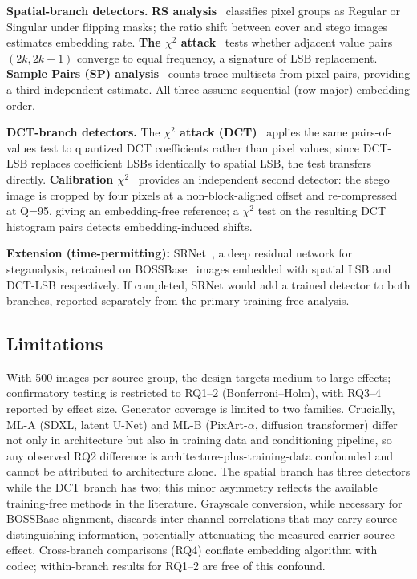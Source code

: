 \documentclass[10pt,twocolumn,a4paper]{article}
\begin{document}
\textbf{Spatial-branch detectors.} \textbf{RS analysis}~\cite{fridrich2001lsb} classifies pixel groups as Regular or Singular under flipping masks; the ratio shift between cover and stego images estimates embedding rate. \textbf{The $\chi^2$ attack}~\cite{westfeld1999chi} tests whether adjacent value pairs $(2k, 2k\!+\!1)$ converge to equal frequency, a signature of LSB replacement. \textbf{Sample Pairs (SP) analysis}~\cite{dumitrescu2003sp} counts trace multisets from pixel pairs, providing a third independent estimate. All three assume sequential (row-major) embedding order.

\textbf{DCT-branch detectors.} The \textbf{$\chi^2$ attack (DCT)}~\cite{westfeld1999chi} applies the same pairs-of-values test to quantized DCT coefficients rather than pixel values; since DCT-LSB replaces coefficient LSBs identically to spatial LSB, the test transfers directly. \textbf{Calibration $\chi^2$}~\cite{fridrich2003calib} provides an independent second detector: the stego image is cropped by four pixels at a non-block-aligned offset and re-compressed at Q=95, giving an embedding-free reference; a $\chi^2$ test on the resulting DCT histogram pairs detects embedding-induced shifts.

\textbf{Extension (time-permitting):} SRNet~\cite{boroumand2019srnet}, a deep residual network for steganalysis, retrained on BOSSBase~\cite{bas2011boss} images embedded with spatial LSB and DCT-LSB respectively. If completed, SRNet would add a trained detector to both branches, reported separately from the primary training-free analysis.

\subsection{Limitations}

With 500 images per source group, the design targets medium-to-large effects; confirmatory testing is restricted to RQ1--2 (Bonferroni--Holm), with RQ3--4 reported by effect size. Generator coverage is limited to two families. Crucially, ML-A (SDXL, latent U-Net) and ML-B (PixArt-$\alpha$, diffusion transformer) differ not only in architecture but also in training data and conditioning pipeline, so any observed RQ2 difference is architecture-plus-training-data confounded and cannot be attributed to architecture alone. The spatial branch has three detectors while the DCT branch has two; this minor asymmetry reflects the available training-free methods in the literature. Grayscale conversion, while necessary for BOSSBase alignment, discards inter-channel correlations that may carry source-distinguishing information, potentially attenuating the measured carrier-source effect. Cross-branch comparisons (RQ4) conflate embedding algorithm with codec; within-branch results for RQ1--2 are free of this confound.
\end{document}
